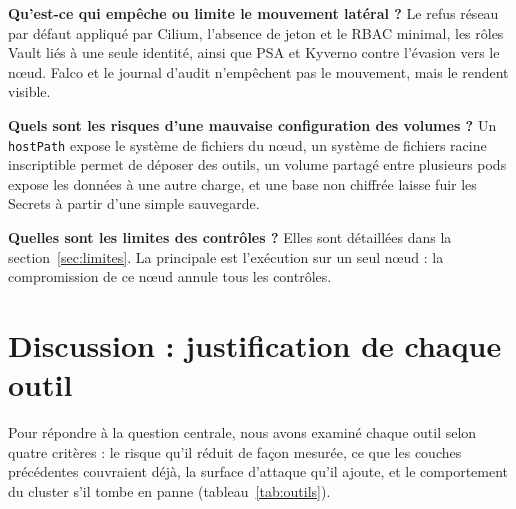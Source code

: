 \documentclass[11pt,a4paper]{article}
\newcommand{\code}[1]{\texttt{#1}}
\begin{document}
\textbf{Qu'est-ce qui empêche ou limite le mouvement latéral ?} Le refus réseau par défaut appliqué par Cilium, l'absence de jeton et le RBAC minimal, les rôles Vault liés à une seule identité, ainsi que PSA et Kyverno contre l'évasion vers le nœud. Falco et le journal d'audit n'empêchent pas le mouvement, mais le rendent visible.

\textbf{Quels sont les risques d'une mauvaise configuration des volumes ?} Un \code{hostPath} expose le système de fichiers du nœud, un système de fichiers racine inscriptible permet de déposer des outils, un volume partagé entre plusieurs pods expose les données à une autre charge, et une base non chiffrée laisse fuir les Secrets à partir d'une simple sauvegarde.

\textbf{Quelles sont les limites des contrôles ?} Elles sont détaillées dans la section~\ref{sec:limites}. La principale est l'exécution sur un seul nœud : la compromission de ce nœud annule tous les contrôles.

\section{Discussion : justification de chaque outil}

Pour répondre à la question centrale, nous avons examiné chaque outil selon quatre critères : le risque qu'il réduit de façon mesurée, ce que les couches précédentes couvraient déjà, la surface d'attaque qu'il ajoute, et le comportement du cluster s'il tombe en panne (tableau~\ref{tab:outils}).
\end{document}
